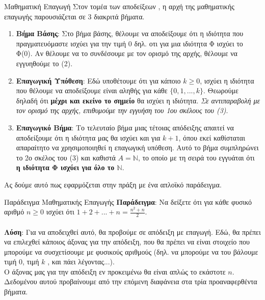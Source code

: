 \documentclass[size=14pt, paper=smartboard, style=fyma, mode=present]{powerdot}
\begin{document}
\begin{slide}[toc=]{Μαθηματική Επαγωγή}
Στον τομέα των αποδείξεων , η αρχή της μαθηματικής επαγωγής παρουσιάζεται σε 3 διακριτά βήματα.
		\begin{enumerate}
			\item \textbf{Βήμα Βάσης}: Στο βήμα βάσης, θέλουμε να αποδείξουμε ότι η ιδιότητα που πραγματευόμαστε ισχύει για την τιμή 0 δηλ. οτι για μια ιδιότητα Φ ισχύει το Φ(0). Αν θέλουμε να το συνδέσουμε με τον ορισμό της αρχής, θέλουμε να εγγυηθούμε το (2).
			\item \textbf{Επαγωγική Υπόθεση}: Εδώ υποθέτουμε ότι για κάποιο $k\ge0$, ισχύει η ιδιότητα που θέλουμε να αποδείξουμε είναι αληθής για κάθε $\{0,1,...,k\}$. Θεωρούμε δηλαδή ότι \textbf{μέχρι και εκείνο το σημείο} θα ισχύει η ιδιότητα. \textit{Σε αντιπαραβολή με τον ορισμό της αρχής, επιθυμούμε την εγγυήση του 1ου σκέλους του (3)}.
			\item \textbf{Επαγωγικό Βήμα}: Το τελευταίο βήμα μιας τέτοιας απόδειξης απαιτεί να αποδείξουμε ότι η ιδιότητα μας θα ισχύει και για $k+1$, όπου εκεί καθίσταται απαραίτητο να χρησιμοποιηθεί η επαγωγική υπόθεση. Αυτό το βήμα συμπληρώνει το 2ο σκέλος του (3) και καθιστά $A=\mathbb{N}$, το οποίο με τη σειρά του εγγυάται ότι\textbf{ η ιδιότητα Φ ισχύει για όλο το $\mathbb{N}$}.
		\end{enumerate}
Ας δούμε αυτό πως εφαρμόζεται στην πράξη με ένα απλοϊκό παράδειγμα.
\end{slide}
\begin{slide}[toc=]{Παράδειγμα Μαθηματικής Επαγωγής}
{\large \textbf{Παράδειγμα}: Να δείξετε ότι για κάθε φυσικό αριθμό $n \ge 0$ ισχύει ότι {\Large $1+2+...+n=\frac{n^2+n}{2}$}.\\~\\
\textbf{Λύση}: Για να αποδειχθεί αυτό, θα προβούμε σε απόδειξη με επαγωγή. Εδώ, θα πρέπει να επιλεχθεί κάποιος άξονας για την απόδειξη, που θα πρέπει να είναι στοιχείο που μπορούμε να συσχετίσουμε με φυσικούς αριθμούς (δηλ. να μπορούμε να του βάλουμε τιμή 0, τιμή $k$ , και πάει λέγοντας...). \\ 
Ο άξονας μας για την απόδειξη εν προκειμένω θα είναι απλώς το εκάστοτε $n$. Δεδομένου αυτού προβαίνουμε από την επόμενη διαφάνεια στα τρία προαναφερθέντα βήματα.}
\end{slide}
\end{document}
